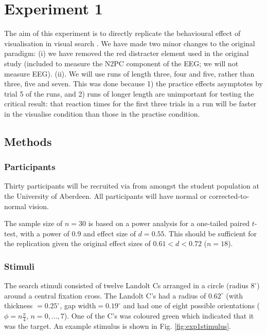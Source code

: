 \documentclass[smallextended]{svjour3}       %
\begin{document}
\section{Experiment 1}
\label{sec:exp1}

The aim of this experiment is to directly replicate the behavioural effect of visualisation in visual search \citep{reinhart2015}. We have made two minor changes to the original paradigm: (i) we have removed the red distracter element used in the original study (included to measure the N2PC component of the EEG; we will not measure EEG). (ii). We will use runs of length three, four and five, rather than three, five and seven. This was done because 1) the practice effects asymptotes by trial 5 of the runs, and 2) runs of longer length are unimportant for testing the critical result: that reaction times for the first three trials in a run will be faster in the visualise condition than those in the practise condition. 

\subsection{Methods}

\subsubsection{Participants}

Thirty participants will be recruited via from amongst the student population at the University of Aberdeen. All participants will have normal or corrected-to-normal vision. 

The sample size of $n=30$ is based on a power analysis for a one-tailed paired $t$-test, with a power of 0.9 and effect size of $d=0.55$. This should be sufficient for the replication given the original effect sizes of $0.61<d<0.72$ ($n=18$).


\subsubsection{Stimuli}

The search stimuli consisted of twelve Landolt Cs arranged in a circle (radius $8^{\circ}$) around a central fixation cross. The Landolt C's had a radius of $0.62^{\circ}$ (with thickness $=0.25^{\circ}$, gap width$=0.19^{\circ}$ and had one of eight possible orientations ($\phi=n\frac{\pi}{4}$, $n=0,\ldots,7$). One of the C's was coloured green which indicated that it was the target. An example stimulus is shown in Fig. \ref{fig:exp1stimulus}.
\end{document}
